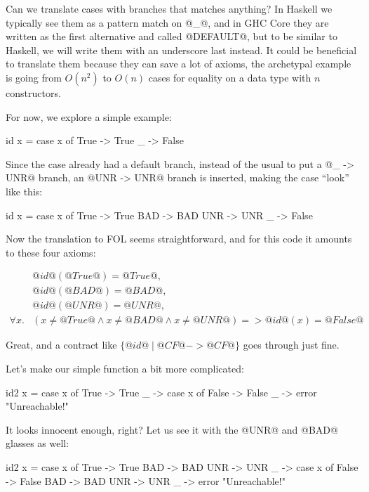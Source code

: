 
Can we translate cases with branches that matches anything?  In
Haskell we typically see them as a pattern match on @_@, and in GHC
Core they are written as the first alternative and called @DEFAULT@,
but to be similar to Haskell, we will write them with an underscore
last instead. It could be beneficial to translate them because they
can save a lot of axioms, the archetypal example is going from
$O(n^2)$ to $O(n)$ cases for equality on a data type with $n$
constructors.

For now, we explore a simple example:

\begin{code}
    id x = case x of
        True -> True
        _    -> False
\end{code}

Since the case already had a default branch, instead of the usual to
put a @_ -> UNR@ branch, an @UNR -> UNR@ branch is inserted, making
the case ``look'' like this:

\begin{code}
    id x = case x of
        True -> True
        BAD  -> BAD
        UNR  -> UNR
        _    -> False
\end{code}

Now the translation to FOL seems straightforward, and for this code
it amounts to these four axioms:

\[\begin{array}{rl}
 & @id@(@True@) = @True@, \\
 & @id@(@BAD@) = @BAD@, \\
 & @id@(@UNR@) = @UNR@, \\
\forall x . &
    (x \neq @True@ \land
     x \neq @BAD@ \land
     x \neq @UNR@) =>  @id@(x) = @False@
\end{array}\]

Great, and a contract like $\{ @id@ \mid @CF@ -> @CF@ \}$ goes through
just fine.

Let's make our simple function a bit more complicated:

\begin{code}
    id2 x = case x of
        True -> True
        _    -> case x of
            False -> False
            _     -> error "Unreachable!"
\end{code}

It looks innocent enough, right? Let us see it with the @UNR@ and
@BAD@ glasses as well:

\begin{code}
    id2 x = case x of
        True -> True
        BAD  -> BAD
        UNR  -> UNR
        _    -> case x of
            False -> False
            BAD  -> BAD
            UNR  -> UNR
            _     -> error "Unreachable!"
\end{code}

